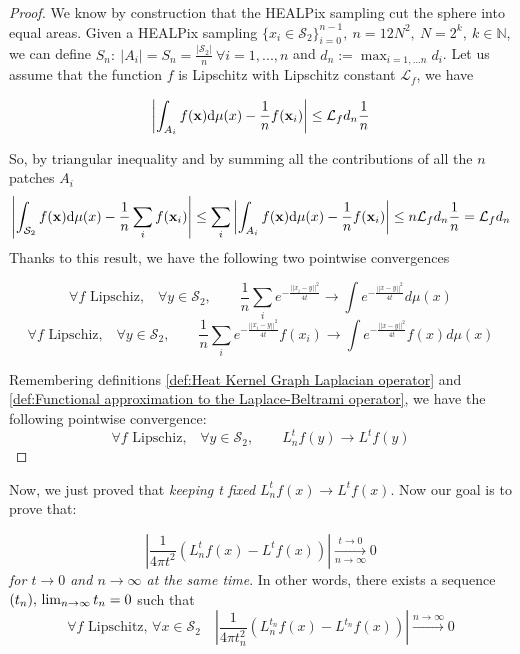 \begin{proof}
	We know by construction that the HEALPix sampling cut the sphere into equal areas. Given a HEALPix sampling $\{x_i\in\mathcal S_2\}_{i=0}^{n-1},\ n=12N^2,\ N=2^k,\ k\in\mathbb N$, we can define $S_n: \ |A_i|=S_n=\frac{|\mathcal S_2|}{n}\ \forall i=1, ..., n$ and $d_n := \max_{i=1,...n}d_i$.
	Let us assume that the function $f$ is Lipschitz with Lipschitz constant $\mathcal L_f$, we have 
	
	$$\left| \int_{A_{i}}f({\bf x})\text{d}{\mu(x)} - \frac{1}{n}f(\mathbf x_i)\right| \leq \mathcal L_fd_{n}\frac{1}{n} $$

	So, by triangular inequality and by summing all the contributions of all the $n$ patches $A_i$
	$$\left| \int_{\mathcal S_2}f({\bf x})\text{d}{\mu(x)} - \frac{1}{n}\sum_i f(\mathbf x_i)\right| \leq \sum_i \left| \int_{A_{i}}f({\bf x})\text{d}{\mu(x)} - \frac{1}{n}f(\mathbf x_i)\right|\leq n  \mathcal L_fd_{n}\frac{1}{n} = \mathcal L_fd_{n}$$	
	Thanks to this result, we have the following two pointwise convergences
	
	$$\forall f \text{ Lipschiz,}\quad \forall y\in\mathcal S_2,  \quad\quad \frac{1}{n}\sum_i e^{-\frac{||x_i-y||^2}{4t}}\rightarrow \int e^{-\frac{||x-y||^2}{4t}}d\mu(x)$$
	$$\forall f \text{ Lipschiz,}\quad \forall y\in\mathcal S_2,  \quad\quad \frac{1}{n}\sum_i e^{-\frac{||x_i-y||^2}{4t}}f(x_i)\rightarrow \int e^{-\frac{||x-y||^2}{4t}}f(x)d\mu(x)$$
	
	Remembering definitions \ref{def:Heat Kernel Graph Laplacian operator} and \ref{def:Functional approximation to the Laplace-Beltrami operator}, we have the following pointwise convergence:
	$$\forall f \text{ Lipschiz,}\quad \forall y\in\mathcal S_2,  \quad\quad L_n^tf(y)\rightarrow  L^tf(y)$$
\end{proof}
\vspace{0.5cm}

Now, we just proved that \textit{keeping t fixed} $L_n^tf(x)\rightarrow L^tf(x)$. Now our goal is to prove that:

\vspace{0.5cm}
\begin{prop}\label{prop:2}
$$\left|\frac{1}{4\pi t^2}\left(L_n^tf(x) -L^tf(x)\right)\right|\xrightarrow[n\to \infty]{t\to 0}0$$
\textit{for $t\to0$ and $n\to\infty$ at the same time}. In other words, there exists a sequence $(t_n), \\ \lim_{n\to\infty}t_n=0$ such that 
$$\forall f \text{ Lipschitz, } \forall x\in\mathcal S_2 \quad \left|\frac{1}{4\pi t_n^2}\left(L_n^{t_n}f(x) - L^{t_n}f(x)\right)\right|\xrightarrow{n\to \infty}0$$
\end{prop}
\vspace{0.5cm}

